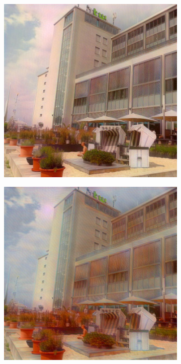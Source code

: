 \begin{figure}[H]
    \centering
    \begin{subfigure}[h]{0.15\textwidth}
        \centering
        \includegraphics[width=\textwidth]{resources/content/experiments/a__the_scream__768x768__style-weight_1e+05__tv-weight_0e+00.jpg}
    \end{subfigure}
    \begin{subfigure}[h]{0.15\textwidth}
        \centering
        \includegraphics[width=\textwidth]{resources/content/experiments/a__the_scream__768x768__style-weight_1e+06__tv-weight_0e+00.jpg}

\end{subfigure}
\end{figure}
